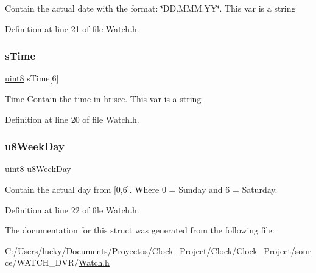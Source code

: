 Contain the actual date with the format\+: \char`\"{}\+D\+D.\+M\+M\+M.\+Y\+Y\char`\"{}. This var is a string 

Definition at line 21 of file Watch.\+h.

\mbox{\label{struct_watch__st_str_data_add4de7b4e18487b32279fe59da546907}} 
\subsubsection{\texorpdfstring{sTime}{sTime}}
{\footnotesize\ttfamily \mbox{\hyperlink{_p_i_t_8h_adde6aaee8457bee49c2a92621fe22b79}{uint8}} s\+Time\mbox{[}6\mbox{]}}

Time Contain the time in hr\+:sec. This var is a string 

Definition at line 20 of file Watch.\+h.

\mbox{\label{struct_watch__st_str_data_abe5f8ac7f28cee19ee69b12602da9adc}} 
\subsubsection{\texorpdfstring{u8WeekDay}{u8WeekDay}}
{\footnotesize\ttfamily \mbox{\hyperlink{_p_i_t_8h_adde6aaee8457bee49c2a92621fe22b79}{uint8}} u8\+Week\+Day}

Contain the actual day from \mbox{[}0,6\mbox{]}. Where 0 = Sunday and 6 = Saturday. 

Definition at line 22 of file Watch.\+h.



The documentation for this struct was generated from the following file\+:\begin{DoxyCompactItemize}
\item 
C\+:/\+Users/lucky/\+Documents/\+Proyectos/\+Clock\+\_\+\+Project/\+Clock/\+Clock\+\_\+\+Project/source/\+W\+A\+T\+C\+H\+\_\+\+D\+V\+R/\mbox{\hyperlink{_watch_8h}{Watch.\+h}}\end{DoxyCompactItemize}

